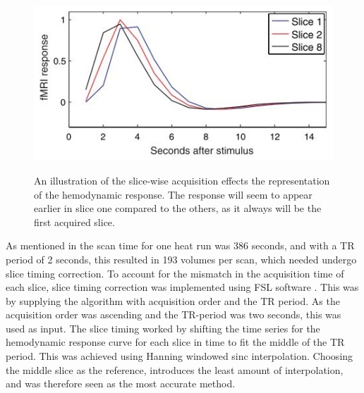 \begin{figure}[H] 
	{\includegraphics[width=.65\textwidth]{figures/aBackground/response}}  
	\caption{An illustration of the slice-wise acquisition effects the representation of the hemodynamic response. The response will seem to appear earlier in slice one compared to the others, as it always will be the first acquired slice. \cite{Poldrack2011}}
	\label{fig:meth:slice}
\end{figure}

As mentioned in  the scan time for one heat run was 386 seconds, and with a TR period of 2 seconds, this resulted in 193 volumes per scan, which needed undergo slice timing correction. To account for the mismatch in the acquisition time of each slice, slice timing correction was implemented using FSL software \cite{FMRIB2018}. This was by supplying the algorithm with acquisition order and the TR period. As the acquisition order was ascending and the TR-period was two seconds, this was used as input. The slice timing worked by shifting the time series for the hemodynamic response curve for each slice in time to fit the middle of the TR period. This was achieved using Hanning windowed sinc interpolation. Choosing the middle slice as the reference, introduces the least amount of interpolation, and was therefore seen as the most accurate method. \cite{Poldrack2011} 

    
